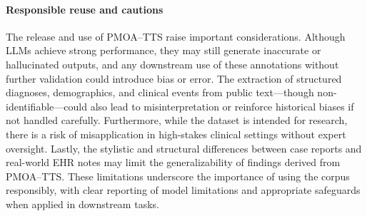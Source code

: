 \paragraph{Responsible reuse and cautions}

The release and use of PMOA–TTS raise important considerations. Although LLMs achieve strong performance, they may still generate inaccurate or hallucinated outputs, and any downstream use of these annotations without further validation could introduce bias or error. The extraction of structured diagnoses, demographics, and clinical events from public text—though non-identifiable—could also lead to misinterpretation or reinforce historical biases if not handled carefully. Furthermore, while the dataset is intended for research, there is a risk of misapplication in high-stakes clinical settings without expert oversight. Lastly, the stylistic and structural differences between case reports and real-world EHR notes may limit the generalizability of findings derived from PMOA–TTS. These limitations underscore the importance of using the corpus responsibly, with clear reporting of model limitations and appropriate safeguards when applied in downstream tasks.

